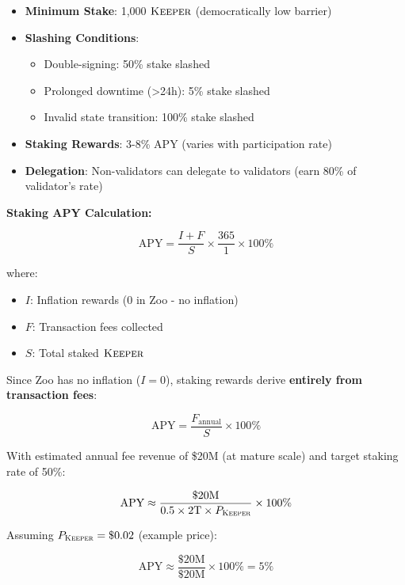 \begin{itemize}
\item \textbf{Minimum Stake}: 1,000 $\textsc{Keeper}$ (democratically low barrier)
\item \textbf{Slashing Conditions}:
    \begin{itemize}
    \item Double-signing: 50\% stake slashed
    \item Prolonged downtime (>24h): 5\% stake slashed
    \item Invalid state transition: 100\% stake slashed
    \end{itemize}
\item \textbf{Staking Rewards}: 3-8\% APY (varies with participation rate)
\item \textbf{Delegation}: Non-validators can delegate to validators (earn 80\% of validator's rate)
\end{itemize}

\textbf{Staking APY Calculation:}

\begin{equation}
\text{APY} = \frac{I + F}{S} \times \frac{365}{1} \times 100\%
\end{equation}

where:
\begin{itemize}
\item $I$: Inflation rewards (0 in Zoo - no inflation)
\item $F$: Transaction fees collected
\item $S$: Total staked $\textsc{Keeper}$
\end{itemize}

Since Zoo has no inflation ($I = 0$), staking rewards derive \textbf{entirely from transaction fees}:

\begin{equation}
\text{APY} = \frac{F_{\text{annual}}}{S} \times 100\%
\end{equation}

With estimated annual fee revenue of \$20M (at mature scale) and target staking rate of 50\%:

\begin{equation}
\text{APY} \approx \frac{\$20\text{M}}{0.5 \times 2\text{T} \times P_{\textsc{Keeper}}} \times 100\%
\end{equation}

Assuming $P_{\textsc{Keeper}} = \$0.02$ (example price):

\begin{equation}
\text{APY} \approx \frac{\$20\text{M}}{\$20\text{M}} \times 100\% = 5\%
\end{equation}

